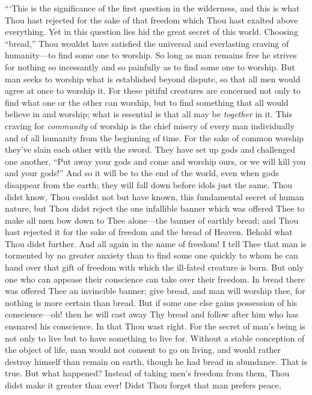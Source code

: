 ```This is the significance of the first question in the wilderness,
and this is what Thou hast rejected for the sake of that freedom which
Thou hast exalted above everything. Yet in this question lies hid the
great secret of this world. Choosing ``bread,'' Thou wouldst have
satisfied the universal and everlasting craving of hu\-man\-i\-ty---to
find some one to worship. So long as man remains free he strives for
nothing so incessantly and so painfully as to find some one to
worship. But man seeks to worship what is established beyond dispute,
so that all men would agree at once to worship it. For these pitiful
creatures are concerned not only to find what one or the other can
worship, but to find something that all would believe in and worship;
what is essential is that all may be \textit{together} in it. This
craving for \textit{community} of worship is the chief misery of every
man individually and of all humanity from the beginning of time.
 For the sake of common worship they've slain each other
with the sword. They have set up gods and challenged one another,
``Put away your gods and come and worship ours, or we will kill you
and your gods!'' And so it will be to the end of the world, even when
gods disappear from the earth; they will fall down before idols just
the same. Thou didst know, Thou couldst not but have known, this
fundamental secret of human nature, but Thou didst reject the one
infallible banner which was offered Thee to make all men bow down to
Thee a\-lone---the banner of earthly bread; and Thou hast rejected it
for the sake of freedom and the bread of Heaven. Behold what Thou
didst further. And all again in the name of freedom! I tell Thee that
man is tormented by no greater anxiety than to find some one quickly
to whom he can hand over that gift of freedom with which the ill-fated
creature is born. But only one who can appease their conscience can
take over their freedom. In bread there was offered Thee an invincible
banner; give bread, and man will worship thee, for nothing is more
certain than bread. But if some one else gains possession of his
con\-science---oh! then he will cast away Thy bread and follow after
him who has ensnared his conscience. In that Thou wast right. For the
secret of man's being is not only to live but to have something to
live for. Without a stable conception of the object of life, man would
not consent to go on living, and would rather destroy himself than
remain on earth, though he had bread in abundance. That is true. But
what happened? Instead of taking men's freedom from them, Thou didst
make it greater than ever! Didst Thou forget that man prefers peace,
